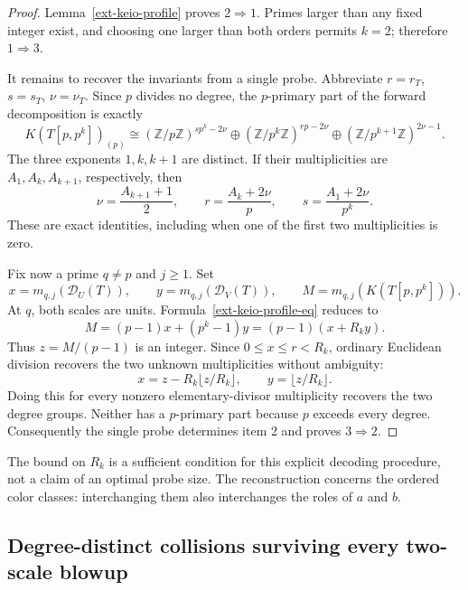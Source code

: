 \documentclass[11pt,a4paper]{article}
\theoremstyle{definition}\newtheorem{definition}[theorem]{Definition}
\theoremstyle{remark}\newtheorem{remark}[theorem]{Remark}
\newcommand{\Z}{\mathbb Z}\newcommand{\Q}{\mathbb Q}\newcommand{\F}{\mathbb F}
\numberwithin{equation}{section}
\begin{document}
\begin{proof}
Lemma~\ref{ext-keio-profile} proves $2\Rightarrow1$.  Primes larger than any
fixed integer exist, and choosing one larger than both orders permits $k=2$;
therefore $1\Rightarrow3$.

It remains to recover the invariants from a single probe.  Abbreviate
$r=r_T$, $s=s_T$, $\nu=\nu_T$.  Since $p$ divides no degree, the $p$-primary
part of the forward decomposition is exactly
\begin{equation}
 K(T[p,p^k])_{(p)}\cong
 (\Z/p\Z)^{s p^k-2\nu}\oplus
 (\Z/p^k\Z)^{r p-2\nu}\oplus
 (\Z/p^{k+1}\Z)^{2\nu-1}.                                 \label{ext-keio-probe-primary}
\end{equation}
The three exponents $1,k,k+1$ are distinct.  If their multiplicities are
$A_1,A_k,A_{k+1}$, respectively, then
\begin{equation}
 \nu=\frac{A_{k+1}+1}{2},\qquad
 r=\frac{A_k+2\nu}{p},\qquad
 s=\frac{A_1+2\nu}{p^k}.                                   \label{ext-keio-recover-counts}
\end{equation}
These are exact identities, including when one of the first two
multiplicities is zero.

Fix now a prime $q\ne p$ and $j\geq1$.  Set
\[
 x=m_{q,j}(\mathcal D_U(T)),\qquad
 y=m_{q,j}(\mathcal D_V(T)),\qquad
 M=m_{q,j}(K(T[p,p^k])).
\]
At $q$, both scales are units.  Formula~\eqref{ext-keio-profile-eq} reduces to
\[
 M=(p-1)x+(p^k-1)y=(p-1)(x+R_k y).
\]
Thus $z=M/(p-1)$ is an integer.  Since $0\leq x\leq r<R_k$, ordinary Euclidean
division recovers the two unknown multiplicities without ambiguity:
\begin{equation}
 x=z-R_k\lfloor z/R_k\rfloor,\qquad
 y=\lfloor z/R_k\rfloor.                                  \label{ext-keio-radix}
\end{equation}
Doing this for every nonzero elementary-divisor multiplicity recovers the
two degree groups.  Neither has a $p$-primary part because $p$ exceeds every
degree.  Consequently the single probe determines item 2 and proves
$3\Rightarrow2$.
\end{proof}

The bound on $R_k$ is a sufficient condition for this explicit decoding
procedure, not a claim of an optimal probe size.  The reconstruction concerns
the ordered color classes: interchanging them also interchanges the roles of
$a$ and $b$.

\subsection{Degree-distinct collisions surviving every two-scale blowup}
\end{document}
